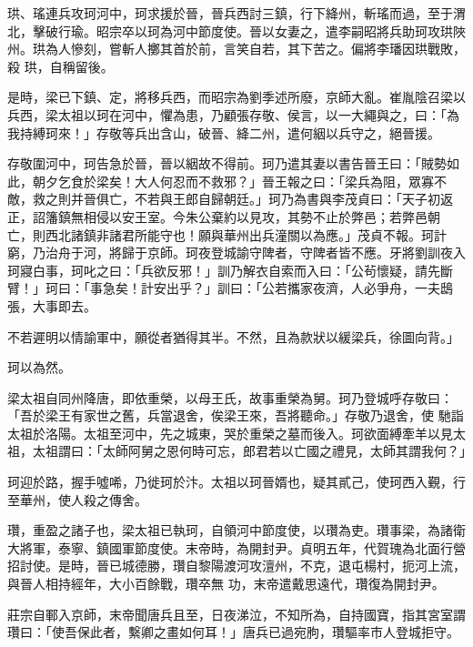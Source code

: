 \begin{pinyinscope}
 珙、瑤連兵攻珂河中，珂求援於晉，晉兵西討三鎮，行下絳州，斬瑤而過，至于渭北，擊破行瑜。昭宗卒以珂為河中節度使。晉以女妻之，遣李嗣昭將兵助珂攻珙陜州。珙為人慘刻，嘗斬人擲其首於前，言笑自若，其下苦之。偏將李璠因珙戰敗，殺
 珙，自稱留後。



 是時，梁已下鎮、定，將移兵西，而昭宗為劉季述所廢，京師大亂。崔胤陰召梁以兵西，梁太祖以珂在河中，懼為患，乃顧張存敬、侯言，以一大繩與之，曰：「為我持縛珂來！」存敬等兵出含山，破晉、絳二州，遣何絪以兵守之，絕晉援。



 存敬圍河中，珂告急於晉，晉以絪故不得前。珂乃遣其妻以書告晉王曰：「賊勢如此，朝夕乞食於梁矣！大人何忍而不救邪？」晉王報之曰：「梁兵為阻，眾寡不敵，救之則并晉俱亡，不若與王郎自歸朝廷。」珂乃為書與李茂貞曰：「天子初返正，詔籓鎮無相侵以安王室。今朱公棄約以見攻，其勢不止於弊邑；若弊邑朝
 亡，則西北諸鎮非諸君所能守也！願與華州出兵潼關以為應。」茂貞不報。珂計窮，乃治舟于河，將歸于京師。珂夜登城諭守陴者，守陴者皆不應。牙將劉訓夜入珂寢白事，珂叱之曰：「兵欲反邪！」訓乃解衣自索而入曰：「公茍懷疑，請先斷臂！」珂曰：「事急矣！計安出乎？」訓曰：「公若攜家夜濟，人必爭舟，一夫鴟張，大事即去。



 不若遲明以情諭軍中，願從者猶得其半。不然，且為款狀以緩梁兵，徐圖向背。」



 珂以為然。



 梁太祖自同州降唐，即依重榮，以母王氏，故事重榮為舅。珂乃登城呼存敬曰：「吾於梁王有家世之舊，兵當退舍，俟梁王來，吾將聽命。」存敬乃退舍，使
 馳詣太祖於洛陽。太祖至河中，先之城東，哭於重榮之墓而後入。珂欲面縛牽羊以見太祖，太祖謂曰：「太師阿舅之恩何時可忘，郎君若以亡國之禮見，太師其謂我何？」



 珂迎於路，握手噓唏，乃徙珂於汴。太祖以珂晉婿也，疑其貳己，使珂西入覲，行至華州，使人殺之傳舍。



 瓚，重盈之諸子也，梁太祖已執珂，自領河中節度使，以瓚為吏。瓚事梁，為諸衛大將軍，泰寧、鎮國軍節度使。末帝時，為開封尹。貞明五年，代賀瑰為北面行營招討使。是時，晉已城德勝，瓚自黎陽渡河攻澶州，不克，退屯楊村，扼河上流，與晉人相持經年，大小百餘戰，瓚卒無
 功，末帝遣戴思遠代，瓚復為開封尹。



 莊宗自鄆入京師，末帝聞唐兵且至，日夜涕泣，不知所為，自持國寶，指其宮室謂瓚曰：「使吾保此者，繫卿之畫如何耳！」唐兵已過宛朐，瓚驅率市人登城拒守。




\end{pinyinscope}
